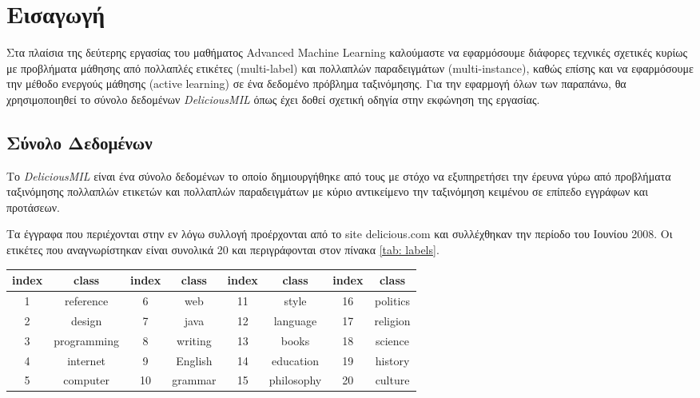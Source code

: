 \section{Εισαγωγή}
Στα πλαίσια της δεύτερης εργασίας του μαθήματος Advanced Machine Learning καλούμαστε να εφαρμόσουμε διάφορες τεχνικές σχετικές κυρίως με προβλήματα μάθησης από πολλαπλές ετικέτες (multi-label) και πολλαπλών παραδειγμάτων (multi-instance), καθώς επίσης και να εφαρμόσουμε την μέθοδο ενεργούς μάθησης (active learning) σε ένα δεδομένο πρόβλημα ταξινόμησης. 
Για την εφαρμογή όλων των παραπάνω, θα χρησιμοποιηθεί το σύνολο δεδομένων \emph{DeliciousMIL} όπως έχει δοθεί σχετική οδηγία στην εκφώνηση της εργασίας.

\subsection{Σύνολο Δεδομένων}
Το \emph{DeliciousMIL} είναι ένα σύνολο δεδομένων το οποίο δημιουργήθηκε από τους\cite{Soleimani} με στόχο να εξυπηρετήσει την έρευνα γύρω από προβλήματα ταξινόμησης πολλαπλών ετικετών και πολλαπλών παραδειγμάτων με κύριο αντικείμενο την ταξινόμηση κειμένου σε επίπεδο εγγράφων και προτάσεων.

Τα έγγραφα που περιέχονται στην εν λόγω συλλογή προέρχονται από το site delicious.com και συλλέχθηκαν την περίοδο του Ιουνίου 2008. Οι ετικέτες που αναγνωρίστηκαν είναι συνολικά 20 και περιγράφονται στον πίνακα \ref{tab: labels}.

	\begin{table*}
	\centering
	\caption{Περιγραφή των Ετικετών}
	\label{tab: labels}
	\begin{tabular}{cccccccc}
		\hline
		\ttfamily index  & \ttfamily class & \ttfamily index  & \ttfamily class &
		\ttfamily index  & \ttfamily class & \ttfamily index  & \ttfamily class \\ \hline
		1 & reference	& 6	& web		&	11	&	style  & 16 & politics   \\ \hline
		2 & design		& 7	& java		&	12	&	language  & 17 & religion  \\ \hline
		3 & programming & 8	& writing	&	13	&	books  & 18 & science  \\ \hline
		4 & internet	& 9	& English	&	14	&	education  & 19 & history  \\ \hline
		5 & computer	& 10& grammar	&	15	&	philosophy  & 20 & culture \\ \hline
	\end{tabular}
\end{table*}

